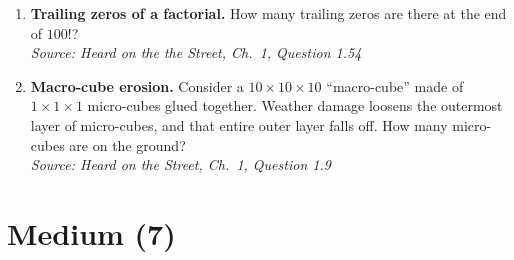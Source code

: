 \documentclass[11pt]{article}
\begin{document}
\begin{enumerate}[label=\textbf{\arabic*.}]
\item \textbf{Trailing zeros of a factorial.} How many trailing zeros are there at the end of $100!$?\\
\hfill{\small\textit{Source: Heard on the the Street, Ch.\ 1, Question 1.54 }}

\item \textbf{Macro-cube erosion.} Consider a $10\times 10\times 10$ ``macro-cube'' made of $1\times 1\times 1$ micro-cubes glued together. Weather damage loosens the outermost layer of micro-cubes, and that entire outer layer falls off. How many micro-cubes are on the ground?\\
\hfill{\small\textit{Source: Heard on the Street, Ch.\ 1, Question 1.9}}
\end{enumerate}

\section*{Medium (7)}
\end{document}
